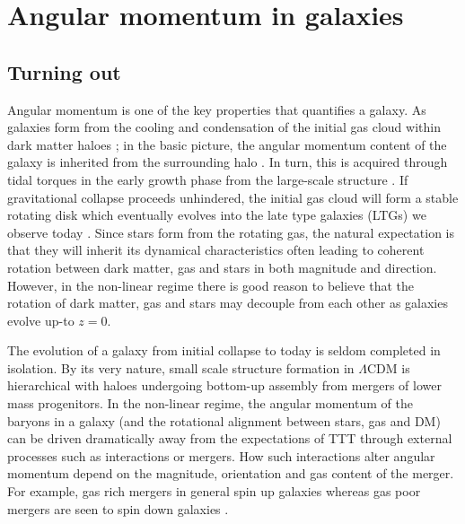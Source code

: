 \section{Angular momentum in galaxies} \label{sec:ang_mom_intro}
\subsection{Turning out}
Angular momentum is one of the key properties that quantifies a galaxy. As galaxies form from the cooling and condensation of the initial gas cloud within dark matter haloes \citep{white1978, mo1998}; in the basic picture, the angular momentum content of the galaxy is inherited from the surrounding halo \citep[][]{fall1980}. In turn, this is acquired through tidal torques in the early growth phase from the large-scale structure \citep[tidal torque theory, TTT;][]{peebles1969, Doroshkevich1970}. If gravitational collapse proceeds unhindered, the initial gas cloud will form a stable rotating disk which eventually evolves into the late type galaxies (LTGs) we observe today \citep{white1978}. Since stars form from the rotating gas, the natural expectation is that they will inherit its dynamical characteristics often leading to coherent rotation between dark matter, gas and stars in both magnitude and direction. However, in the non-linear regime there is good reason to believe that the rotation of dark matter, gas and stars may decouple from each other as galaxies evolve up-to $z=0$. 

The evolution of a galaxy from initial collapse to today is seldom completed in isolation. By its very nature, small scale structure formation in $\Lambda$CDM is hierarchical with haloes undergoing bottom-up assembly from mergers of lower mass progenitors. In the non-linear regime, the angular momentum of the baryons in a galaxy (and the rotational alignment between stars, gas and DM) can be driven dramatically away from the expectations of TTT through external processes such as interactions or mergers. How such interactions alter angular momentum depend on the magnitude, orientation and gas content of the merger. For example, gas rich mergers in general spin up galaxies whereas gas poor mergers are seen to spin down galaxies \citep[][]{lagos2017,lagos2018}.

